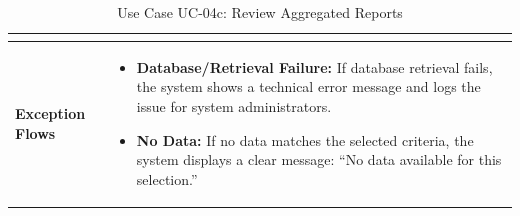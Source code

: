 \begin{table}[H]
\begin{tabular}{|p{3cm}|p{11cm}|}
\begin{itemize}
\end{itemize} \\ 
\hline
\textbf{Exception Flows} & 
\begin{itemize}
    \item \textbf{Database/Retrieval Failure:} If database retrieval fails, the system shows a technical error message and logs the issue for system administrators.
    \item \textbf{No Data:} If no data matches the selected criteria, the system displays a clear message: ``No data available for this selection.''
\end{itemize} \\ 
\hline
\end{tabular}
\caption{Use Case UC-04c: Review Aggregated Reports}
\end{table}








